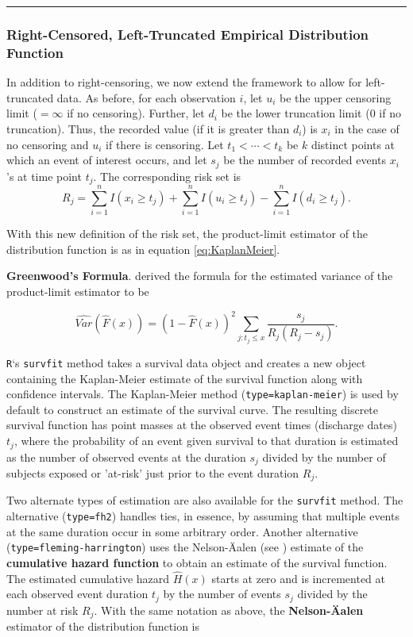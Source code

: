 \documentclass[]{book}
\theoremstyle{definition}
\theoremstyle{definition}
\theoremstyle{definition}
\theoremstyle{remark}
\begin{document}
\begin{center}\rule{0.5\linewidth}{\linethickness}\end{center}

\subsubsection{Right-Censored, Left-Truncated Empirical Distribution
Function}\label{right-censored-left-truncated-empirical-distribution-function}

In addition to right-censoring, we now extend the framework to allow for
left-truncated data. As before, for each observation \(i\), let \(u_i\)
be the upper censoring limit (\(=\infty\) if no censoring). Further, let
\(d_i\) be the lower truncation limit (0 if no truncation). Thus, the
recorded value (if it is greater than \(d_i\)) is \(x_i\) in the case of
no censoring and \(u_i\) if there is censoring. Let
\(t_{1} <\cdots< t_{k}\) be \(k\) distinct points at which an event of
interest occurs, and let \(s_j\) be the number of recorded events
\(x_i\)'s at time point \(t_{j}\). The corresponding risk set is
\[R_j = \sum_{i=1}^n I(x_i \geq t_{j}) + \sum_{i=1}^n I(u_i \geq t_{j}) - \sum_{i=1}^n I(d_i \geq t_{j}).\]

With this new definition of the risk set, the product-limit estimator of
the distribution function is as in equation \eqref{eq:KaplanMeier}.

\textbf{Greenwood's Formula}. \citep{greenwood1926} derived the formula
for the estimated variance of the product-limit estimator to be

\[\widehat{Var}(\hat{F}(x)) = (1-\hat{F}(x))^{2} \sum _{j:t_{j} \leq x} \dfrac{s_j}{R_{j}(R_{j}-s_j)}.\]

\texttt{R}`s \texttt{survfit} method takes a survival data object and
creates a new object containing the Kaplan-Meier estimate of the
survival function along with confidence intervals. The Kaplan-Meier
method (\texttt{type=\textquotesingle{}kaplan-meier\textquotesingle{}})
is used by default to construct an estimate of the survival curve. The
resulting discrete survival function has point masses at the observed
event times (discharge dates) \(t_j\), where the probability of an event
given survival to that duration is estimated as the number of observed
events at the duration \(s_j\) divided by the number of subjects exposed
or 'at-risk' just prior to the event duration \(R_j\).

Two alternate types of estimation are also available for the
\texttt{survfit} method. The alternative
(\texttt{type=\textquotesingle{}fh2\textquotesingle{}}) handles ties, in
essence, by assuming that multiple events at the same duration occur in
some arbitrary order. Another alternative
(\texttt{type=\textquotesingle{}fleming-harrington\textquotesingle{}})
uses the Nelson-Äalen (see \citep{aalen1978}) estimate of the
\textbf{cumulative hazard function} to obtain an estimate of the
survival function. The estimated cumulative hazard \(\hat{H}(x)\) starts
at zero and is incremented at each observed event duration \(t_j\) by
the number of events \(s_j\) divided by the number at risk \(R_j\). With
the same notation as above, the \textbf{Nelson-Äalen} estimator of the
distribution function is
\end{document}
